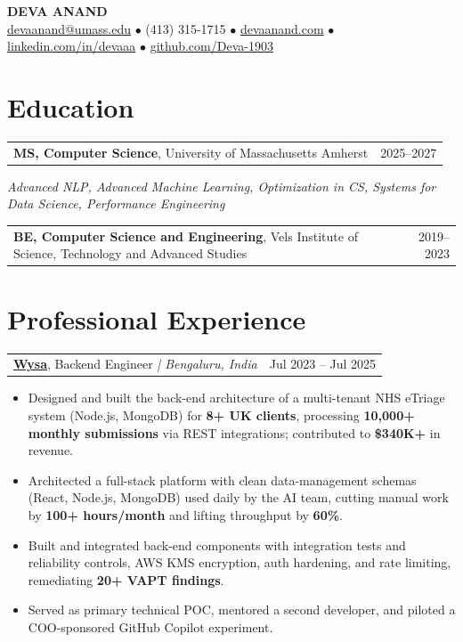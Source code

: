 \documentclass[letterpaper,11pt]{article}
\makeatletter
\newcommand{\eduItem}[3]{%
  \begin{tabular*}{\textwidth}{@{}l@{\extracolsep{\fill}}r@{}}
    \textbf{#1}, #2 & #3 \\
  \end{tabular*}\par
}
\newcommand{\expItem}[4]{%
  \vspace{3pt}
  \begin{tabular*}{\textwidth}{@{}l@{\extracolsep{\fill}}r@{}}
    \textbf{#1}, #2 \textit{| #3} & #4 \\
  \end{tabular*}\par\vspace{-2pt}
}
\makeatother
\begin{document}
\begin{center}
    {\fontsize{18}{20}\selectfont\bfseries DEVA ANAND}\\ \vspace{3pt}
    {\small
    \href{mailto:devaanand@umass.edu}{devaanand@umass.edu}
    \enspace$\bullet$\enspace
    (413) 315-1715
    \enspace$\bullet$\enspace
    \href{https://devaanand.com}{devaanand.com}
    \enspace$\bullet$\enspace
    \href{https://linkedin.com/in/devaaa/}{linkedin.com/in/devaaa}
    \enspace$\bullet$\enspace
    \href{https://github.com/Deva-1903}{github.com/Deva-1903}}
\end{center}
\vspace{-6pt}

\section{Education}
\eduItem{MS, Computer Science}{University of Massachusetts Amherst}{2025--2027}
{\small\textit{Advanced NLP, Advanced Machine Learning, Optimization in CS, Systems for Data Science, Performance Engineering}}\par
\vspace{3pt}
\eduItem{BE, Computer Science and Engineering}{Vels Institute of Science, Technology and Advanced Studies}{2019--2023}

\section{Professional Experience}

\expItem{\href{https://www.wysa.io}{Wysa}}{Backend Engineer}{Bengaluru, India}{Jul 2023 -- Jul 2025}
\begin{itemize}
  \item Designed and built the back-end architecture of a multi-tenant NHS eTriage system (Node.js, MongoDB) for \textbf{8+ UK clients}, processing \textbf{10{,}000+ monthly submissions} via REST integrations; contributed to \textbf{\$340K+} in revenue.
  \item Architected a full-stack platform with clean data-management schemas (React, Node.js, MongoDB) used daily by the AI team, cutting manual work by \textbf{100+ hours/month} and lifting throughput by \textbf{60\%}.
  \item Built and integrated back-end components with integration tests and reliability controls, AWS KMS encryption, auth hardening, and rate limiting, remediating \textbf{20+ VAPT findings}.
  \item Served as primary technical POC, mentored a second developer, and piloted a COO-sponsored GitHub Copilot experiment.
\end{itemize}
\end{document}

